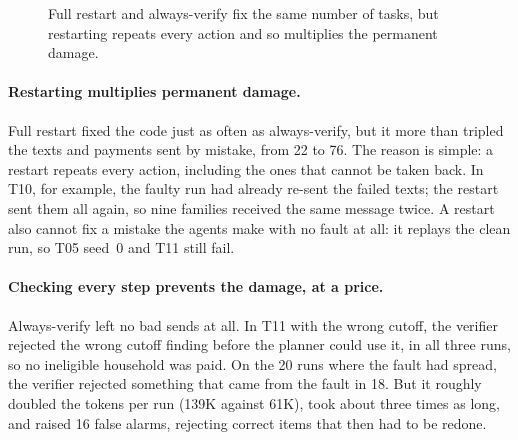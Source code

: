 \documentclass{article}
\begin{document}
\begin{figure}[htbp]
\centering
{}
\caption{Full restart and always-verify fix the same number of tasks, but restarting repeats every action and so multiplies the permanent damage.}
\label{fig:recovery}
\end{figure}

\paragraph{Restarting multiplies permanent damage.} Full restart fixed the code just as often as always-verify, but it more than tripled the texts and payments sent by mistake, from 22 to 76. The reason is simple: a restart repeats every action, including the ones that cannot be taken back. In T10, for example, the faulty run had already re-sent the failed texts; the restart sent them all again, so nine families received the same message twice. A restart also cannot fix a mistake the agents make with no fault at all: it replays the clean run, so T05 seed~0 and T11 still fail.

\paragraph{Checking every step prevents the damage, at a price.} Always-verify left no bad sends at all. In T11 with the wrong cutoff, the verifier rejected the wrong cutoff finding before the planner could use it, in all three runs, so no ineligible household was paid. On the 20 runs where the fault had spread, the verifier rejected something that came from the fault in 18. But it roughly doubled the tokens per run (139K against 61K), took about three times as long, and raised 16 false alarms, rejecting correct items that then had to be redone.
\end{document}
